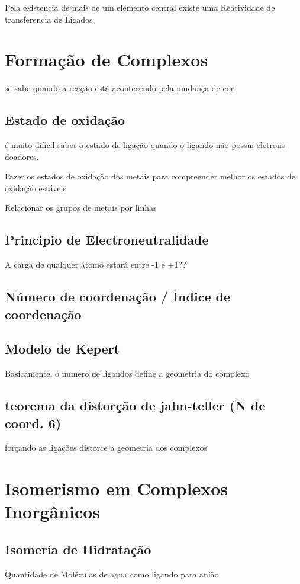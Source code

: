 \documentclass[12pt]{article}
\begin{document}
Pela existencia de mais de um elemento central existe uma Reatividade de transferencia de Ligados

\section{Formação de Complexos}
se sabe quando a reação está acontecendo pela mudança de cor

\subsection{Estado de oxidação}
é muito dificil saber o estado de ligação quando o ligando não possui eletrons doadores.

Fazer os estados de oxidação dos metais para compreender melhor os estados de oxidação estáveis

Relacionar os grupos de metais por linhas

\subsection{Principio de Electroneutralidade}
A carga de qualquer átomo estará entre -1 e +1??

\subsection{Número de coordenação / Indice de coordenação}

\subsection{Modelo de Kepert}
Basicamente, o numero de ligandos define a geometria do complexo

\subsection{teorema da distorção de jahn-teller (N de coord. 6)}
forçando as ligações distorce a geometria dos complexos

\section{Isomerismo em Complexos Inorgânicos}

\subsection{Isomeria de Hidratação}
Quantidade de Moléculas de agua como ligando para anião
\end{document}
